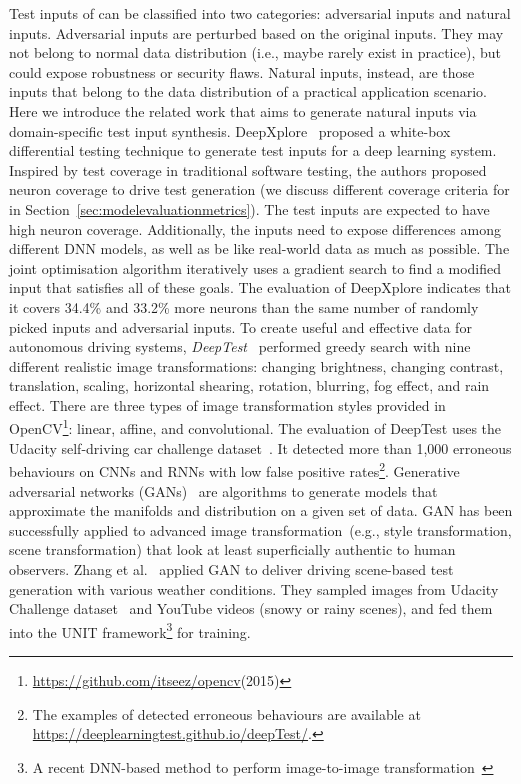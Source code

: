 Test inputs of \mlt{} can be classified into two categories: adversarial inputs and natural inputs.
Adversarial inputs are perturbed based on the original inputs. 
They may not belong to normal data distribution (i.e., maybe rarely exist in practice), but could expose robustness or security flaws. 
Natural inputs, instead, are those inputs that belong to the data distribution of a practical application scenario.
Here we introduce the related work that aims to generate natural inputs via domain-specific test input synthesis.
DeepXplore~ proposed a white-box differential testing technique to generate test inputs for a deep learning system.
Inspired by test coverage in traditional software testing, the authors proposed neuron coverage to drive test generation (we discuss different coverage criteria for \mlt{} in Section~\ref{sec:modelevaluationmetrics}).
The test inputs are expected to have high neuron coverage.
Additionally, the inputs need to expose differences among different DNN models, as well as be like real-world data as much as possible.
The joint optimisation algorithm iteratively uses a gradient search to find a modified input that satisfies all of these goals.
The evaluation of DeepXplore indicates that it covers 34.4\% and 33.2\% more neurons than the same number of randomly picked inputs and adversarial inputs.
To create useful and effective data for autonomous driving systems, \emph{DeepTest}~ performed greedy search with nine different realistic image transformations: changing brightness, changing contrast, translation, scaling, horizontal shearing, rotation, blurring, fog effect, and rain effect.
There are three types of image transformation styles provided in OpenCV\footnote{\url{https://github.com/itseez/opencv}(2015)}: linear, affine, and convolutional.
The evaluation of DeepTest uses the Udacity self-driving car challenge dataset~.
It detected more than 1,000 erroneous behaviours on CNNs and RNNs with low false positive rates\footnote{The examples of detected erroneous behaviours are available at \url{https://deeplearningtest.github.io/deepTest/}.}.
Generative adversarial networks (GANs)~ are algorithms to generate models that approximate the manifolds and distribution on a given set of data. GAN has been successfully applied to advanced image transformation~(e.g., style transformation, scene transformation) that look at least superficially authentic to human observers.
Zhang et al.~ applied GAN to deliver driving scene-based test generation with various weather conditions.
They sampled images from Udacity Challenge dataset~ and YouTube videos (snowy or rainy scenes), and fed them into the UNIT framework\footnote{A recent
DNN-based method to perform image-to-image transformation~} for training. 
